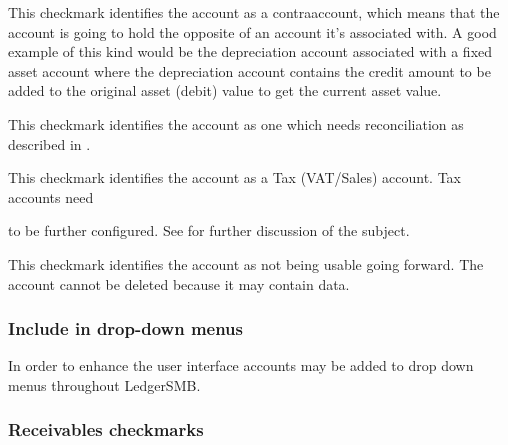 \begin{description}[style=nextline]
    \item[Contra] This checkmark identifies the account as a \gls{contra}account, which means
    that the account is going to hold the opposite of an account it's associated with.
    A good example of this kind would be the depreciation account associated with a fixed
    asset account where the depreciation account contains the credit amount to be added to
    the original asset (debit) value to get the current asset value.
    \item[Recon] This checkmark identifies the account as one which needs reconciliation as
    described in .
    \item[Tax] This checkmark identifies the account as a Tax (VAT/Sales) account. Tax accounts need

    to be further configured. See  for further discussion of the
    subject.
    \item[Obsolete] This checkmark identifies the account as not being usable going forward.  The account cannot be deleted because it may
    contain data.
    \label{item:AccountOptionsTax}
\end{description}


\subsubsection{Include in drop-down menus}
\label{subsec-coa-account-links}

In order to enhance the user interface accounts may be added to drop down menus throughout LedgerSMB.

\subsubsection{Receivables checkmarks}
\label{subsubsec-coa-AR-checkmarks}

